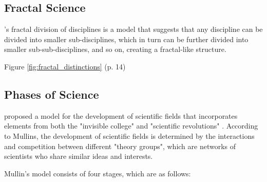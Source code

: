 \subsection{Fractal Science}

\citeauthor{abbott2001}'s \citeyearpar{abbott2001} fractal division of disciplines is a model that suggests that any discipline can be divided into smaller sub-disciplines, which in turn can be further divided into smaller sub-sub-disciplines, and so on, creating a fractal-like structure.

Figure \ref{fig:fractal_distinctions} (p. 14)




\subsection{Phases of Science}

\cite{mullins1973} proposed a model for the development of scientific fields that incorporates elements from both the "invisible college" \citep{desollaprice1966, crane1969, crane1972, paisley1972} and "scientific revolutions" \citep{kuhn2012}. According to Mullins, the development of scientific fields is determined by the interactions and competition between different "theory groups", which are networks of scientists who share similar ideas and interests.

Mullin's model consists of four stages, which are as follows:

